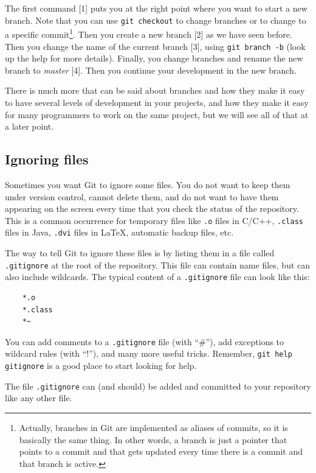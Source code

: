The first command [1] puts you at the right point where you want to
start a new branch. Note that you can use \verb+git checkout+ to
change branches or to change to a specific commit\footnote{Actually,
  branches in Git are implemented as aliases of commits, so it is
  basically the same thing. In other words, a branch is just a pointer
  that points to a commit and that gets updated every time there is a
  commit and that branch is active.}. Then you create a new branch [2]
as we have seen before. Then you change the name of the current
branch [3], using \verb+git branch -b+ (look up the help for more
details). Finally, you change branches and rename the new branch to
\emph{master} [4]. Then you continue your development in the new
branch. 

There is much more that can be said about branches and how they make
it easy to have several levels of development in your projects, and
how they make it easy for many programmers to work on the same
project, but we will see all of that at a later point. 

\subsection{Ignoring files}
\label{sec:ignoring-files}

Sometimes you want Git to ignore some files. You do not want to keep
them under version control, cannot delete them, and do not want to
have them appearing on the screen every time that you check the status
of the repository. This is a common occurrence for temporary files
like \verb+.o+ files in C/C++, \verb+.class+ files in Java,
\verb+.dvi+ files in \LaTeX, automatic backup files, etc.

The way to tell Git to ignore these files is by listing them in a file
called \verb+.gitignore+ at the root of the repository. This file can
contain name files, but can also include wildcards. The typical
content of a \verb+.gitignore+ file can look like this:

\begin{verbatim}
    *.o
    *.class
    *~
\end{verbatim}

You can add comments to a \verb+.gitignore+ file (with ``\#''), add
exceptions to wildcard rules (with ``!''), and many more useful
tricks. Remember, \verb+git help gitignore+ is a good place to start
looking for help. 

The file \verb+.gitignore+ can (and should) be added and 
committed to your repository like any other file.





